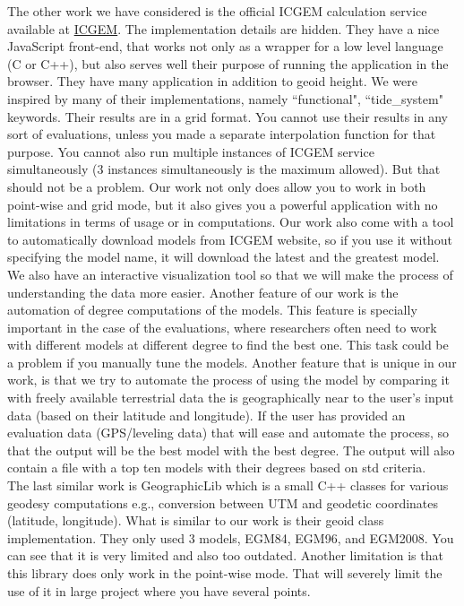 The other work we have considered is the official ICGEM calculation service available at \href{http://icgem.gfz-potsdam.de/ICGEM/Service.html}{ICGEM}. The implementation details are hidden. They have a nice JavaScript front-end, that works not only as a wrapper for a low level language (C or C++), but also serves well their purpose of running the application in the browser. They have many application in addition to geoid height. We were inspired by many of their implementations, namely ``functional", ``tide\_system" keywords. Their results are in a grid format. You cannot use their results in any sort of evaluations, unless you made a separate interpolation function for that purpose. You cannot also run multiple instances of ICGEM service simultaneously (3 instances simultaneously is the maximum allowed). But that should not be a problem. Our work not only does allow you to work in both point-wise and grid mode, but it also gives you a powerful application with no limitations in terms of usage or in computations. Our work also come with a tool to automatically download models from ICGEM website, so if you use it without specifying the model name, it will download the latest and the greatest model. We also have an interactive visualization tool so that we will make the process of understanding the data more easier. Another feature of our work is the automation of degree computations of the models. This feature is specially important in the case of the evaluations, where researchers often need to work with different models at different degree to find the best one. This task could be a problem if you manually tune the models. Another feature that is unique in our work, is that we try to automate the process of using the model by comparing it with freely available terrestrial data the is geographically near to the user's input data (based on their latitude and longitude). If the user has provided an evaluation data (GPS/leveling data) that will ease and automate the process, so that the output will be the best model with the best degree. The output will also contain a file with a top ten models with their degrees based on std criteria.\\
The last similar work is GeographicLib which is a small C++ classes for various geodesy computations e.g., conversion between UTM and geodetic coordinates (latitude, longitude). What is similar to our work is their geoid class implementation. They only used 3 models,  EGM84, EGM96, and EGM2008. You can see that it is very limited and also too outdated. Another limitation is that this library does only work in the point-wise mode. That will severely limit the use of it in large project where you have several points.  


 

